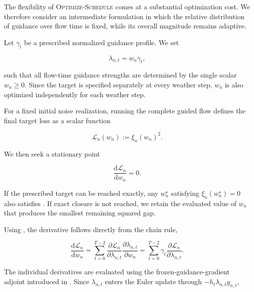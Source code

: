 The flexibility of \textsc{Optimize-Schedule} comes at a substantial
optimization cost. We therefore consider an intermediate formulation in which
the relative distribution of guidance over flow time is fixed, while its
overall magnitude remains adaptive.

Let $\gamma_t$ be a prescribed normalized guidance profile. We set

\begin{equation}
    \lambda_{n,t}
    =
    w_n\gamma_t,
    \label{eq:optimize-gain-lambda}
\end{equation}

such that all flow-time guidance strengths are determined by the single scalar
$w_n\geq0$. Since the target is specified separately at every weather step,
$w_n$ is also optimized independently for each weather step.

For a fixed initial noise realization, running the complete guided flow defines
the final target loss as a scalar function

\begin{equation}
    \mathcal{L}_n(w_n)
    :=
    \xi_n(w_n)^2.
    \label{eq:gain-loss}
\end{equation}

We then seek a stationary point

\begin{equation}
    \frac{\mathrm{d}\mathcal{L}_n}
         {\mathrm{d}w_n}
    =
    0.
    \label{eq:gain-stationarity}
\end{equation}

If the prescribed target can be reached exactly, any $w_n^\star$ satisfying
$\xi_n(w_n^\star)=0$ also satisfies . If exact
closure is not reached, we retain the evaluated value of $w_n$ that produces
the smallest remaining squared gap.

Using , the derivative follows directly from the
chain rule,

\begin{equation}
    \frac{\mathrm{d}\mathcal{L}_n}
         {\mathrm{d}w_n}
    =
    \sum_{t=0}^{T-2}
    \frac{\partial \mathcal{L}_n}
         {\partial \lambda_{n,t}}
    \frac{\partial \lambda_{n,t}}
         {\partial w_n}
    =
    \sum_{t=0}^{T-2}
    \gamma_t
    \frac{\partial \mathcal{L}_n}
         {\partial \lambda_{n,t}}.
    \label{eq:gain-chain-rule}
\end{equation}

The individual derivatives are evaluated using the frozen-guidance-gradient
adjoint introduced in . Since
$\lambda_{n,t}$ enters the Euler update through
$-h_t\lambda_{n,t}g_{n,t}$,

